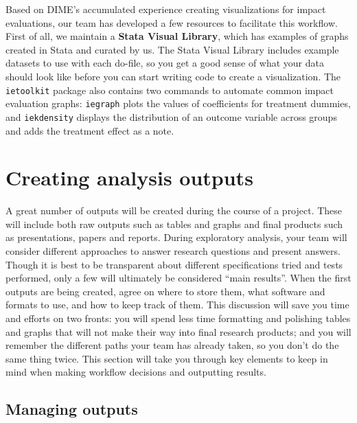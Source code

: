 Based on DIME's accumulated experience creating visualizations for impact evaluations,
our team has developed a few resources to facilitate this workflow.
First of all, we maintain a \textbf{Stata Visual Library},
which has examples of graphs created in Stata and curated by us.
The Stata Visual Library includes example datasets to use with each do-file,
so you get a good sense of what your data should look like
before you can start writing code to create a visualization.
The \texttt{ietoolkit} package also contains two commands to automate
common impact evaluation graphs:
\texttt{iegraph} plots the values of coefficients for treatment dummies,
and \texttt{iekdensity} displays the distribution of an outcome variable
across groups and adds the treatment effect as a note.


\section{Creating analysis outputs}

A great number of outputs will be created during the course of a project.
These will include both raw outputs such as tables and graphs
and final products such as presentations, papers and reports.
During exploratory analysis, your team will consider different approaches
to answer research questions and present answers.
Though it is best to be transparent about different
specifications tried and tests performed,
only a few will ultimately be considered ``main results''.
When the first outputs are being created, agree on where to store them,
what software and formats to use, and how to keep track of them.
This discussion will save you time and efforts on two fronts:
you will spend less time formatting and polishing tables and graphs that
will not make their way into final research products;
and you will remember the different paths your team has already
taken, so you don't do the same thing twice.
This section will take you through key elements to keep in mind
when making workflow decisions and outputting results.


\subsection{Managing outputs}

